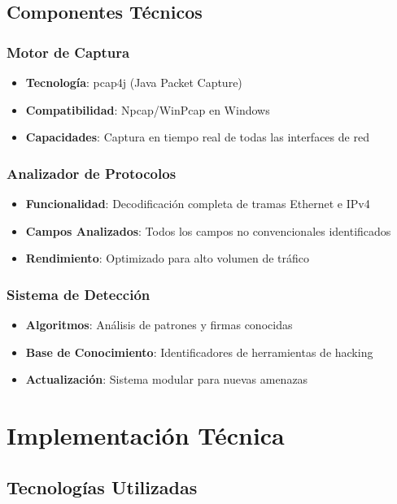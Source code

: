 \documentclass[12pt,a4paper]{article}
\begin{document}
\subsection{Componentes Técnicos}

\subsubsection{Motor de Captura}
\begin{itemize}
    \item \textbf{Tecnología}: pcap4j (Java Packet Capture)
    \item \textbf{Compatibilidad}: Npcap/WinPcap en Windows
    \item \textbf{Capacidades}: Captura en tiempo real de todas las interfaces de red
\end{itemize}

\subsubsection{Analizador de Protocolos}
\begin{itemize}
    \item \textbf{Funcionalidad}: Decodificación completa de tramas Ethernet e IPv4
    \item \textbf{Campos Analizados}: Todos los campos no convencionales identificados
    \item \textbf{Rendimiento}: Optimizado para alto volumen de tráfico
\end{itemize}

\subsubsection{Sistema de Detección}
\begin{itemize}
    \item \textbf{Algoritmos}: Análisis de patrones y firmas conocidas
    \item \textbf{Base de Conocimiento}: Identificadores de herramientas de hacking
    \item \textbf{Actualización}: Sistema modular para nuevas amenazas
\end{itemize}

\section{Implementación Técnica}

\subsection{Tecnologías Utilizadas}
\end{document}
